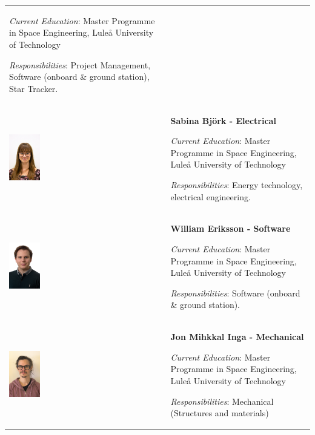 \begin{longtable}[]{m{} m{}}
\smallskip
\textit{Current Education}: Master Programme in Space Engineering, Luleå University of Technology

\smallskip
\textit{Responsibilities}: Project Management, Software (onboard \& ground station), Star Tracker.
\bigskip
\\

\includegraphics[width=0.2\textwidth]{0-cover/img/TEAMPICS/Sabina_final.jpg}  & \textbf{Sabina Bj\"ork - Electrical}

\smallskip
\textit{Current Education}: Master Programme in Space Engineering, Luleå University of Technology

\smallskip
\textit{Responsibilities}: Energy technology, electrical engineering.
\bigskip
\\

\includegraphics[width=0.2\textwidth]{0-cover/img/TEAMPICS/William_final.jpg}  & \textbf{William Eriksson - Software}

\smallskip
\textit{Current Education}: Master Programme in Space Engineering, Luleå University of Technology

\smallskip
\textit{Responsibilities}: Software (onboard \& ground station).
\bigskip
\\

\includegraphics[width=0.2\textwidth]{0-cover/img/TEAMPICS/Jon_final.jpg} & \textbf{Jon Mihkkal Inga - Mechanical}

\smallskip
\textit{Current Education}: Master Programme in Space Engineering, Luleå University of Technology

\smallskip
\textit{Responsibilities}: Mechanical (Structures and materials)

\label{tab:people}
\end{longtable}
\raggedbottom

